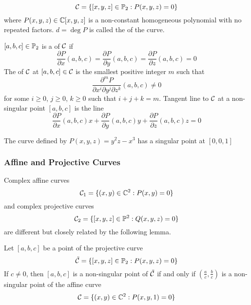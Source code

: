 \begin{definition}
    $$\mathcal C=\{[x,y,z]\in \mathbb P_2:P(x,y,z)=0\}$$
    where $P(x,y,z)\in\mathbb C[x,y,z]$ is a non-constant homogeneous polynomial with no repeated factors. $d=\deg P$ is called the  of the curve.
\end{definition}

\begin{definition}
    $[a,b,c]\in\mathbb P_2$ is a  of $\mathcal C$ if $$\frac{\partial P}{\partial x}(a,b,c)=\frac{\partial P}{\partial y}(a,b,c)=\frac{\partial P}{\partial z}(a,b,c)=0$$
    The  of $\mathcal C$ at $[a,b,c]\in\mathcal C$ is the smallest positive integer $m$ such that $$\frac{\partial^mP}{\partial x^i\partial y^j\partial z^k}(a,b,c)\neq 0$$ for some $i\geq 0$, $j\geq 0$, $k\geq 0$ such that $i+j+k=m$.
    Tangent line to $\mathcal C$ at a non-singular point $[a,b,c]$ is the line $$\frac{\partial P}{\partial x}(a,b,c)x+\frac{\partial P}{\partial y}(a,b,c)y+\frac{\partial P}{\partial z}(a,b,c)z=0$$
\end{definition}

\begin{example}
    The curve defined by $P(x,y,z)=y^2z-x^3$ has a singular point at $[0,0,1]$
\end{example}

\subsubsection{Affine and Projective Curves}

Complex affine curves
$$\mathcal C_1=\{(x,y)\in\mathbb C^2:P(x,y)=0\}$$
and complex projective curves
$$\mathcal C_2=\{[x,y,z]\in \mathbb P^2:Q(x,y,z)=0\}$$
are different but closely related by the following lemma.

\begin{lemma}
    Let $[a,b,c]$ be a point of the projective curve $$\tilde{\mathcal C}=\{[x,y,z]\in \mathbb P_2:P(x,y,z)=0\}$$
    If $c\neq 0$, then $[a,b,c]$ is a non-singular point of $\tilde{\mathcal C}$ if and only if $\left(\frac{a}{c},\frac{b}{c}\right)$ is a non-singular point of the affine curve $$\mathcal C=\{(x,y)\in\mathbb C^2:P(x,y,1)=0\}$$
\end{lemma}

